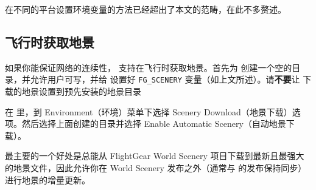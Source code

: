 \medskip
\ifchinese
在不同的平台设置环境变量的方法已经超出了本文的范畴，在此不多赘述。
\fi

\ifchinese
\subsection{飞行时获取地景}
\fi

\ifchinese
如果你能保证网络的连续性，\FlightGear{} 支持在飞行时获取地景。首先为 \TerraSync{} 创建一个空的目录，并允许用户可写，并给 \FlightGear{} 设置好 \texttt{FG\_SCENERY} 变量（如上文所述）。请\textbf{不要}让 \TerraSync{} 下载的地景设置到预先安装的地景目录

在 \FlightGear{} 里，到 Environment（环境）菜单下选择 Scenery Download（地景下载）选项。然后选择上面创建的目录并选择 Enable Automatic Scenery（自动地景下载）。

\TerraSync{} 最主要的一个好处是总能从 FlightGear World Scenery 项目下载到最新且最强大的地景文件，因此允许你在 World Scenery 发布之外（通常与 \FlightGear{} 的发布保持同步）进行地景的增量更新。
\fi
%
%

